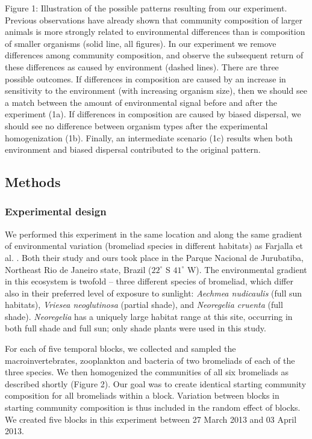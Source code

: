 Figure 1: Illustration of the possible patterns resulting from our
experiment. Previous observations have already shown that community
composition of larger animals is more strongly related to environmental
differences than is composition of smaller organisms (solid line, all
figures). In our experiment we remove differences among community
composition, and observe the subsequent return of these differences as
caused by environment (dashed lines). There are three possible outcomes.
If differences in composition are caused by an increase in sensitivity
to the environment (with increasing organism size), then we should see a
match between the amount of environmental signal before and after the
experiment (1a). If differences in composition are caused by biased
dispersal, we should see no difference between organism types after the
experimental homogenization (1b). Finally, an intermediate scenario (1c)
results when both environment and biased dispersal contributed to the
original pattern.

\subsection{Methods}\label{methods}

\subsubsection{Experimental design}\label{experimental-design}

We performed this experiment in the same location and along the same
gradient of environmental variation (bromeliad species in different
habitats) as Farjalla et al. \citeyearpar{Farjalla2012}. Both their
study and ours took place in the Parque Nacional de Jurubatiba,
Northeast Rio de Janeiro state, Brazil (\(22^{\circ}\) S \(41^{\circ}\)
W). The environmental gradient in this ecosystem is twofold -- three
different species of bromeliad, which differ also in their preferred
level of exposure to sunlight: \emph{Aechmea nudicaulis} (full sun
habitats), \emph{Vriesea neoglutinosa} (partial shade), and
\emph{Neoregelia cruenta} (full shade). \emph{Neoregelia} has a uniquely
large habitat range at this site, occurring in both full shade and full
sun; only shade plants were used in this study.

For each of five temporal blocks, we collected and sampled the
macroinvertebrates, zooplankton and bacteria of two bromeliads of each
of the three species. We then homogenized the communities of all six
bromeliads as described shortly (Figure 2). Our goal was to create
identical starting community composition for all bromeliads within a
block. Variation between blocks in starting community composition is
thus included in the random effect of blocks. We created five blocks in
this experiment between 27 March 2013 and 03 April 2013.

